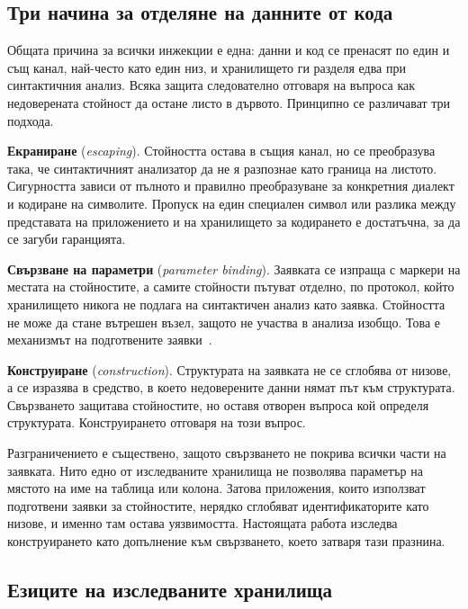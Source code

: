 \subsection{Три начина за отделяне на данните от кода}
\label{sec:theory-remedies}

Общата причина за всички инжекции е една: данни и код се пренасят по един и същ
канал, най-често като един низ, и хранилището ги разделя едва при синтактичния
анализ. Всяка защита следователно отговаря на въпроса как недоверената стойност
да остане листо в дървото. Принципно се различават три подхода.

\textbf{Екраниране} (\textit{escaping}). Стойността остава в същия канал, но се
преобразува така, че синтактичният анализатор да не я разпознае като граница на
листото. Сигурността зависи от пълното и правилно преобразуване за конкретния
диалект и кодиране на символите. Пропуск на един специален символ или разлика
между представата на приложението и на хранилището за кодирането е достатъчна,
за да се загуби гаранцията.

\textbf{Свързване на параметри} (\textit{parameter binding}). Заявката се изпраща
с маркери на местата на стойностите, а самите стойности пътуват отделно, по
протокол, който хранилището никога не подлага на синтактичен анализ като заявка.
Стойността не може да стане вътрешен възел, защото не участва в анализа изобщо.
Това е механизмът на подготвените заявки~\cite{owasp_sqli_prevention}.

\textbf{Конструиране} (\textit{construction}). Структурата на заявката не се
сглобява от низове, а се изразява в средство, в което недоверените данни нямат
път към структурата. Свързването защитава стойностите, но оставя отворен въпроса
кой определя структурата. Конструирането отговаря на този въпрос.

Разграничението е съществено, защото свързването не покрива всички части на
заявката. Нито едно от изследваните хранилища не позволява параметър на мястото
на име на таблица или колона. Затова приложения, които използват подготвени
заявки за стойностите, нерядко сглобяват идентификаторите като низове, и именно
там остава уязвимостта. Настоящата работа изследва конструирането като допълнение
към свързването, което затваря тази празнина.

\subsection{Езиците на изследваните хранилища}
\label{sec:theory-languages}

